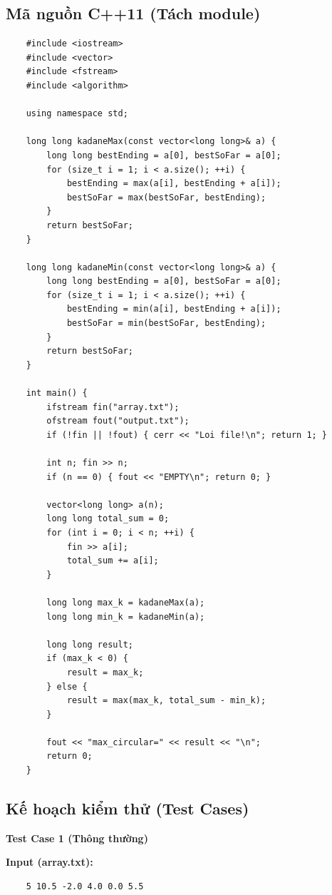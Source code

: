 \subsection{Mã nguồn C++11 (Tách module)}
    \begin{lstlisting}
    #include <iostream>
    #include <vector>
    #include <fstream>
    #include <algorithm>

    using namespace std;

    long long kadaneMax(const vector<long long>& a) {
        long long bestEnding = a[0], bestSoFar = a[0];
        for (size_t i = 1; i < a.size(); ++i) {
            bestEnding = max(a[i], bestEnding + a[i]);
            bestSoFar = max(bestSoFar, bestEnding);
        }
        return bestSoFar;
    }

    long long kadaneMin(const vector<long long>& a) {
        long long bestEnding = a[0], bestSoFar = a[0];
        for (size_t i = 1; i < a.size(); ++i) {
            bestEnding = min(a[i], bestEnding + a[i]);
            bestSoFar = min(bestSoFar, bestEnding);
        }
        return bestSoFar;
    }

    int main() {
        ifstream fin("array.txt");
        ofstream fout("output.txt");
        if (!fin || !fout) { cerr << "Loi file!\n"; return 1; }

        int n; fin >> n;
        if (n == 0) { fout << "EMPTY\n"; return 0; }

        vector<long long> a(n);
        long long total_sum = 0;
        for (int i = 0; i < n; ++i) {
            fin >> a[i];
            total_sum += a[i];
        }

        long long max_k = kadaneMax(a);
        long long min_k = kadaneMin(a);

        long long result;
        if (max_k < 0) {
            result = max_k;
        } else {
            result = max(max_k, total_sum - min_k);
        }

        fout << "max_circular=" << result << "\n";
        return 0;
    }
\end{lstlisting}

\subsection{Kế hoạch kiểm thử (Test Cases)}

    \textbf{Test Case 1 (Thông thường)}

    \textbf{Input (array.txt):}
    \begin{lstlisting}
    5 10.5 -2.0 4.0 0.0 5.5\end{lstlisting}

